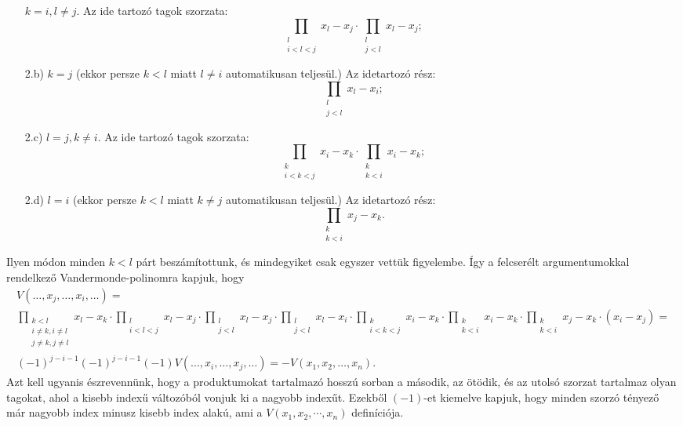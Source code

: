 \documentclass[a4paper, showtrims]{memoir}
\makeatletter
\renewenvironment{proof}[1][\proofname]
    {\par\pushQED{\qed}%
    \normalfont \topsep6\p@\@plus6\p@\relax
    \trivlist
    \item[\hskip\labelsep
        \itshape
    #1\@addpunct{:}]\ignorespaces}
    {\popQED\endtrivlist\@endpefalse}
\theoremstyle{plain}
\theoremstyle{remark}
\theoremstyle{definition}
\makeatother
\begin{document}
\begin{proof}
\begin{itemize}
            $k=i, l\neq j$. Az ide tartozó tagok szorzata:
            \[
                \prod_{\substack{l\\i<l<j}}x_l-x_j\cdot\prod_{\substack{l\\j<l}}x_l-x_j;
            \]
        \item[2.b)]
            $k=j$ (ekkor persze $k<l$ miatt $l\neq i$ automatikusan teljesül.)
            Az idetartozó rész:
            \[
                \prod_{\substack{l\\j<l}}x_l-x_i;
            \]
        \item[2.c)]
            $l=j, k\neq i$. Az ide tartozó tagok szorzata:
            \[
                \prod_{\substack{k\\i<k<j}}x_i-x_k\cdot\prod_{\substack{k\\k<i}}x_i-x_k;
            \]
        \item[2.d)]
            $l=i$ (ekkor persze $k<l$ miatt $k\neq j$ automatikusan teljesül.)
            Az idetartozó rész:
            \[
                \prod_{\substack{k\\k<i}}x_j-x_k.
            \]
    \end{itemize}
    Ilyen módon minden $k<l$ párt beszámítottunk, és mindegyiket csak egyszer vettük figyelembe.
    Így a felcserélt argumentumokkal rendelkező Vandermonde-polinomra kapjuk, hogy
    \begin{multline*}
        V\left( \ldots,x_j,\ldots,x_i,\ldots \right)=\\
                \prod_{\substack{k<l\\i\neq k,i\neq l\\ j\neq k,j\neq l}}x_l-x_k
                \cdot
                \prod_{\substack{l\\i<l<j}}x_l-x_j\cdot\prod_{\substack{l\\j<l}}x_l-x_j
                \cdot
                \prod_{\substack{l\\j<l}}x_l-x_i
                \cdot
                \prod_{\substack{k\\i<k<j}}x_i-x_k\cdot\prod_{\substack{k\\k<i}}x_i-x_k
                \cdot
                \prod_{\substack{k\\k<i}}x_j-x_k
                \cdot
                \left( x_i-x_j \right)
                =
                \\
                (-1)^{j-i-1}\left( -1 \right)^{j-i-1}\left( -1 \right)V(\ldots,x_i,\ldots,x_j,\ldots)
                =-V(x_1,x_2,\ldots,x_n).
    \end{multline*}
    Azt kell ugyanis észrevennünk, hogy a produktumokat tartalmazó hosszú sorban a második, az ötödik, és az utolsó szorzat tartalmaz olyan tagokat, ahol a kisebb indexű változóból vonjuk ki a nagyobb indexűt.
    Ezekből $(-1)$-et kiemelve kapjuk, hogy minden szorzó tényező már nagyobb index minusz kisebb index alakú,
    ami a $V\left( x_1,x_2,\cdots,x_n \right)$ definíciója.
\end{proof}
\end{document}
